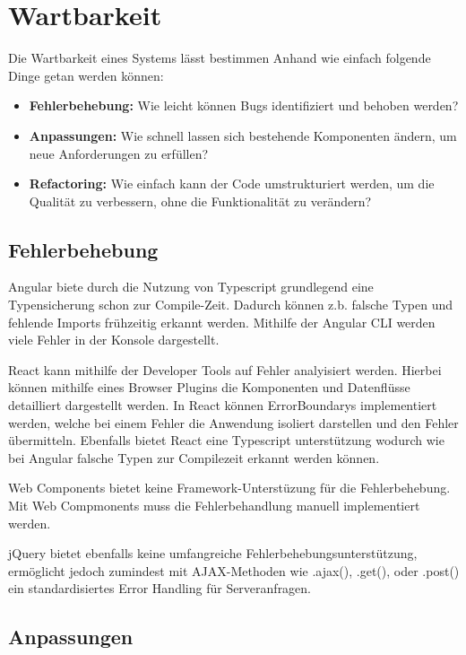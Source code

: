 \documentclass[oneside]{ausarbeitung}
\begin{document}
\section{Wartbarkeit}
Die Wartbarkeit eines Systems lässt bestimmen Anhand wie einfach folgende Dinge getan werden können: 
\begin{itemize}
    \item \textbf{Fehlerbehebung:} Wie leicht können Bugs identifiziert und behoben werden?
    \item \textbf{Anpassungen:} Wie schnell lassen sich bestehende Komponenten ändern, um neue Anforderungen zu erfüllen?
    \item \textbf{Refactoring:} Wie einfach kann der Code umstrukturiert werden, um die Qualität zu verbessern, ohne die Funktionalität zu verändern?
\end{itemize}

\subsection{Fehlerbehebung}

Angular biete durch die Nutzung von Typescript grundlegend eine Typensicherung schon zur Compile-Zeit. Dadurch können z.b. falsche Typen und fehlende Imports frühzeitig erkannt werden. Mithilfe der Angular CLI werden viele Fehler in der Konsole dargestellt. 

React kann mithilfe der Developer Tools auf Fehler analyisiert werden. Hierbei können mithilfe eines Browser Plugins die Komponenten und Datenflüsse detailliert dargestellt werden. In React können ErrorBoundarys implementiert werden, welche bei einem Fehler die Anwendung isoliert darstellen und den Fehler übermitteln. Ebenfalls bietet React eine Typescript unterstützung wodurch wie bei Angular falsche Typen zur Compilezeit erkannt werden können. 

Web Components bietet keine Framework-Unterstüzung für die Fehlerbehebung. Mit Web Compmonents muss die Fehlerbehandlung manuell implementiert werden. 

jQuery bietet ebenfalls keine umfangreiche Fehlerbehebungsunterstützung, ermöglicht jedoch zumindest mit AJAX-Methoden wie .ajax(), .get(), oder .post() ein standardisiertes Error Handling für Serveranfragen.

\subsection{Anpassungen}
\end{document}
